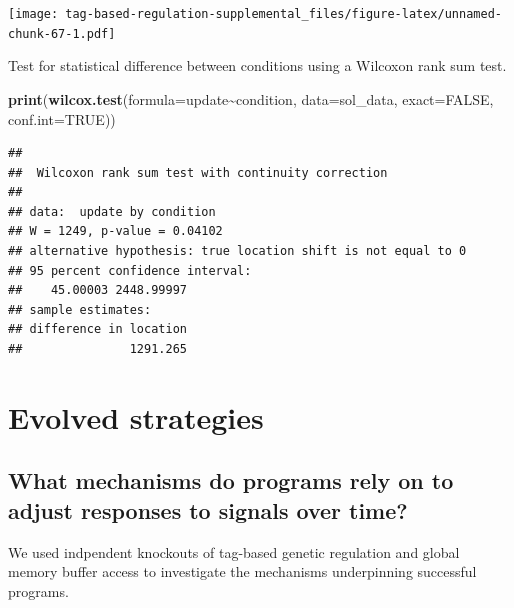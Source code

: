 \documentclass[
]{book}
\newenvironment{Shaded}{\begin{snugshade}}{\end{snugshade}}
\newcommand{\DataTypeTok}[1]{\textcolor[rgb]{0.13,0.29,0.53}{#1}}
\newcommand{\KeywordTok}[1]{\textcolor[rgb]{0.13,0.29,0.53}{\textbf{#1}}}
\newcommand{\NormalTok}[1]{#1}
\newcommand{\OperatorTok}[1]{\textcolor[rgb]{0.81,0.36,0.00}{\textbf{#1}}}
\newcommand{\OtherTok}[1]{\textcolor[rgb]{0.56,0.35,0.01}{#1}}
\begin{document}
\texttt{[image: tag-based-regulation-supplemental\_files/figure-latex/unnamed-chunk-67-1.pdf]}

Test for statistical difference between conditions using a Wilcoxon rank sum test.

\begin{Shaded}
\begin{Highlighting}[]
\KeywordTok{print}\NormalTok{(}\KeywordTok{wilcox.test}\NormalTok{(}\DataTypeTok{formula=}\NormalTok{update}\OperatorTok{\textasciitilde{}}\NormalTok{condition, }\DataTypeTok{data=}\NormalTok{sol\_data, }\DataTypeTok{exact=}\OtherTok{FALSE}\NormalTok{, }\DataTypeTok{conf.int=}\OtherTok{TRUE}\NormalTok{))}
\end{Highlighting}
\end{Shaded}

\begin{verbatim}
## 
##  Wilcoxon rank sum test with continuity correction
## 
## data:  update by condition
## W = 1249, p-value = 0.04102
## alternative hypothesis: true location shift is not equal to 0
## 95 percent confidence interval:
##    45.00003 2448.99997
## sample estimates:
## difference in location 
##               1291.265
\end{verbatim}

\hypertarget{evolved-strategies-1}{%
\section{Evolved strategies}\label{evolved-strategies-1}}

\hypertarget{what-mechanisms-do-programs-rely-on-to-adjust-responses-to-signals-over-time-1}{%
\subsection{What mechanisms do programs rely on to adjust responses to signals over time?}\label{what-mechanisms-do-programs-rely-on-to-adjust-responses-to-signals-over-time-1}}

We used indpendent knockouts of tag-based genetic regulation and global memory buffer access to investigate the mechanisms underpinning successful programs.
\end{document}
